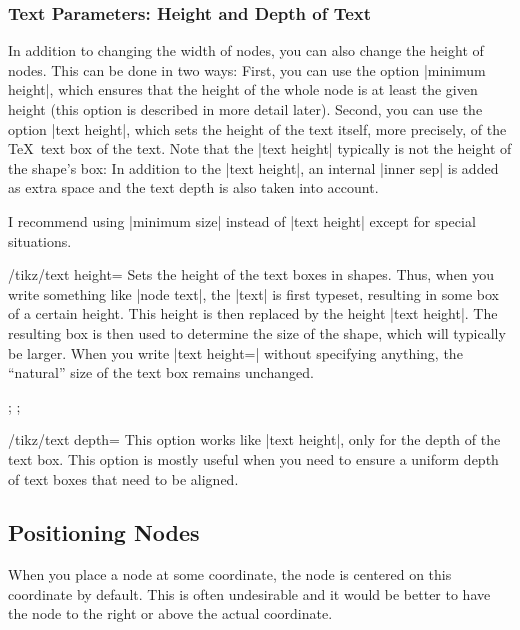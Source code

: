 \subsubsection{Text Parameters: Height and Depth of Text}

In addition to changing the width of nodes, you can also change the height of
nodes. This can be done in two ways: First, you can use the option
|minimum height|, which ensures that the height of the whole node is at least
the given height (this option is described in more detail later). Second, you
can use the option |text height|, which sets the height of the text itself,
more precisely, of the \TeX\ text box of the text. Note that the |text height|
typically is not the height of the shape's box: In addition to the
|text height|, an internal |inner sep| is added as extra space and the text
depth is also taken into account.

I recommend using |minimum size| instead of |text height| except for special
situations.

\begin{key}{/tikz/text height=}
    Sets the height of the text boxes in shapes. Thus, when you write something
    like |node {text}|, the |text| is first typeset, resulting in some box of a
    certain height. This height is then replaced by the height |text height|.
    The resulting box is then used to determine the size of the shape, which
    will typically be larger. When you write |text height=| without specifying
    anything, the ``natural'' size of the text box remains unchanged.
\begin{codeexample}[]
\tikz {};
\tikz {};
\end{codeexample}
\end{key}

\begin{key}{/tikz/text depth=}
    This option works like |text height|, only for the depth of the text box.
    This option is mostly useful when you need to ensure a uniform depth of
    text boxes that need to be aligned.
\end{key}


\subsection{Positioning Nodes}
\label{section-nodes-anchors}

When you place a node at some coordinate, the node is centered on this
coordinate by default. This is often undesirable and it would be better to have
the node to the right or above the actual coordinate.


